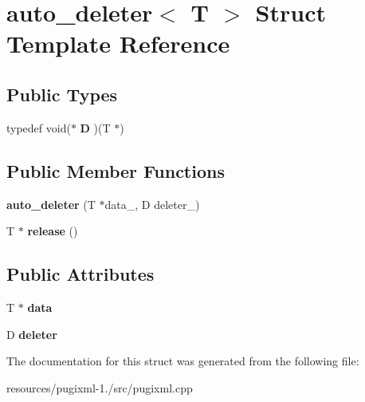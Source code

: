 \hypertarget{structauto__deleter}{\section{auto\+\_\+deleter$<$ T $>$ Struct Template Reference}
\label{structauto__deleter}
}
\subsection*{Public Types}
\begin{DoxyCompactItemize}
\item 
\hypertarget{structauto__deleter_aad0ecaf35a6ad85399b67d9bae35b95f}{typedef void($\ast$ {\bfseries D} )(T $\ast$)}\label{structauto__deleter_aad0ecaf35a6ad85399b67d9bae35b95f}

\end{DoxyCompactItemize}
\subsection*{Public Member Functions}
\begin{DoxyCompactItemize}
\item 
\hypertarget{structauto__deleter_a2740bca25a73f65af24cc99b07da0370}{{\bfseries auto\+\_\+deleter} (T $\ast$data\+\_\+, D deleter\+\_\+)}\label{structauto__deleter_a2740bca25a73f65af24cc99b07da0370}

\item 
\hypertarget{structauto__deleter_af395b878141c8dd3c66833238be812fe}{T $\ast$ {\bfseries release} ()}\label{structauto__deleter_af395b878141c8dd3c66833238be812fe}

\end{DoxyCompactItemize}
\subsection*{Public Attributes}
\begin{DoxyCompactItemize}
\item 
\hypertarget{structauto__deleter_a7c75a965dd01e6ac965b930a75ea3659}{T $\ast$ {\bfseries data}}\label{structauto__deleter_a7c75a965dd01e6ac965b930a75ea3659}

\item 
\hypertarget{structauto__deleter_a306ab6a225284bd12cae5374fea13fe3}{D {\bfseries deleter}}\label{structauto__deleter_a306ab6a225284bd12cae5374fea13fe3}

\end{DoxyCompactItemize}


The documentation for this struct was generated from the following file\+:\begin{DoxyCompactItemize}
\item 
resources/pugixml-\/1./src/pugixml.\+cpp\end{DoxyCompactItemize}
